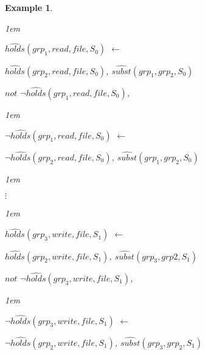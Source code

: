 \documentclass[11pt]{report}
\newtheorem{vexample}{Example}[chapter]
\newenvironment{vquote}
{
  \begin{list}{}{\leftmargin 1em}\item[]
}
{
  \end{list}
}
\begin{document}
\begin{vexample}
\begin{enumerate}
              \begin{vquote}
                $\hat{holds}(grp_1, read, file, S_{0})$ $\leftarrow$

                \hspace{1em}
                $\hat{holds}(grp_2, read, file, S_{0})$,
                $\hat{subst}(grp_1, grp_2, S_{0})$

                \hspace{1em}
                $not$ $\lnot\hat{holds}(grp_1, read, file, S_{0})$,
              \end{vquote}

              \begin{vquote}
                $\lnot\hat{holds}(grp_1, read, file, S_{0})$ $\leftarrow$

                \hspace{1em}
                $\lnot\hat{holds}(grp_2, read, file, S_{0})$,
                $\hat{subst}(grp_1, grp_2, S_{0})$
              \end{vquote}

              \begin{vquote}
                \hspace{2em}$\vdots$
              \end{vquote}

              \begin{vquote}
                $\hat{holds}(grp_3, write, file, S_{1})$ $\leftarrow$

                \hspace{1em}
                $\hat{holds}(grp_2, write, file, S_{1})$,
                $\hat{subst}(grp_3, grp2, S_{1})$

                \hspace{1em}
                $not$ $\lnot\hat{holds}(grp_3, write, file, S_{1})$,
              \end{vquote}

              \begin{vquote}
                $\lnot\hat{holds}(grp_3, write, file, S_{1})$ $\leftarrow$

                \hspace{1em}
                $\lnot\hat{holds}(grp_2, write, file, S_{1})$,
                $\hat{subst}(grp_3, grp_2, S_{1})$
              \end{vquote}


\end{enumerate}
\end{vexample}
\end{document}
